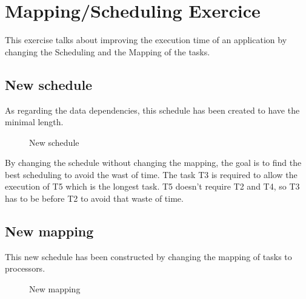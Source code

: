 \section{Mapping/Scheduling Exercice}

This exercise talks about improving the execution time of an application by changing the Scheduling and the Mapping of the tasks.

\subsection{New schedule}

As regarding the data dependencies, this schedule has been created to have the minimal length.

\bigskip

\begin{figure}[h!]
  \caption{New schedule}
  \label{fig:sys}
\end{figure}

By changing the schedule without changing the mapping, the goal is to find the best scheduling to avoid the wast of time.
The task T3 is required to allow the execution of T5 which is the longest task. T5 doesn't require T2 and T4, so T3 has to be before T2 to avoid that waste of time.

\subsection{New mapping}

This new schedule has been constructed by changing the mapping of tasks to processors. 

\bigskip

\begin{figure}[h!]
  \caption{New mapping}
  \label{fig:sys}
\end{figure}

